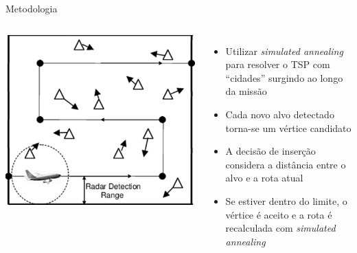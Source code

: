 \documentclass[10pt]{beamer}
\begin{document}
\begin{frame}{Metodologia}
    \begin{columns}
        \centering
        \includegraphics[width=\linewidth]{fig/vant.png}
        \centering
        \begin{itemize}
            \item Utilizar \textit{simulated annealing} para resolver o TSP com “cidades” surgindo ao longo da missão
            \item Cada novo alvo detectado torna-se um vértice candidato
            \item A decisão de inserção considera a distância entre o alvo e a rota atual
            \item Se estiver dentro do limite, o vértice é aceito e a rota é recalculada com \textit{simulated annealing}
        \end{itemize}
    \end{columns}
\end{frame}
\end{document}
